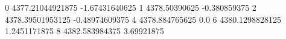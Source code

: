 0 4377.21044921875 -1.67431640625
1 4378.50390625 -0.380859375
2 4378.39501953125 -0.48974609375
4 4378.884765625 0.0
6 4380.1298828125 1.2451171875
8 4382.583984375 3.69921875
